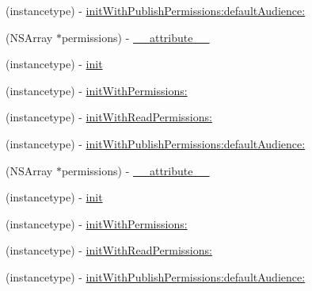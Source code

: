 \begin{DoxyCompactItemize}
(instancetype) -\/ \hyperlink{interfaceFBLoginView_a937f55736400541dc0f21fe01d6a8b96}{init\+With\+Publish\+Permissions\+:default\+Audience\+:}
\item 
(N\+S\+Array $\ast$permissions) -\/ \hyperlink{interfaceFBLoginView_aed5ee6aec67e5fd04eed62c4ff09b9f4}{\+\_\+\+\_\+attribute\+\_\+\+\_\+}
\item 
(instancetype) -\/ \hyperlink{interfaceFBLoginView_ae0dfdb97b6ddecbd42bb778b02d3f890}{init}
\item 
(instancetype) -\/ \hyperlink{interfaceFBLoginView_a0fb6885fd07aa64c90378c9abcfd06a4}{init\+With\+Permissions\+:}
\item 
(instancetype) -\/ \hyperlink{interfaceFBLoginView_a1a7bc3cf0ef2b11b1d3c7b6567ad937f}{init\+With\+Read\+Permissions\+:}
\item 
(instancetype) -\/ \hyperlink{interfaceFBLoginView_a937f55736400541dc0f21fe01d6a8b96}{init\+With\+Publish\+Permissions\+:default\+Audience\+:}
\item 
(N\+S\+Array $\ast$permissions) -\/ \hyperlink{interfaceFBLoginView_aed5ee6aec67e5fd04eed62c4ff09b9f4}{\+\_\+\+\_\+attribute\+\_\+\+\_\+}
\item 
(instancetype) -\/ \hyperlink{interfaceFBLoginView_ae0dfdb97b6ddecbd42bb778b02d3f890}{init}
\item 
(instancetype) -\/ \hyperlink{interfaceFBLoginView_a0fb6885fd07aa64c90378c9abcfd06a4}{init\+With\+Permissions\+:}
\item 
(instancetype) -\/ \hyperlink{interfaceFBLoginView_a1a7bc3cf0ef2b11b1d3c7b6567ad937f}{init\+With\+Read\+Permissions\+:}
\item 
(instancetype) -\/ \hyperlink{interfaceFBLoginView_a937f55736400541dc0f21fe01d6a8b96}{init\+With\+Publish\+Permissions\+:default\+Audience\+:}
\end{DoxyCompactItemize}
